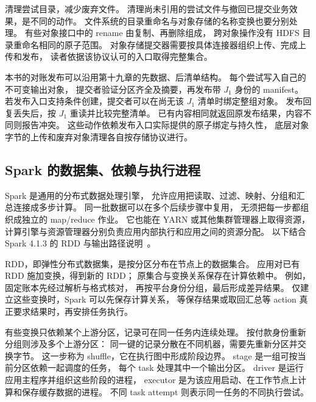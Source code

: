  清理尝试目录，减少废弃文件。
清理尚未引用的尝试文件与撤回已提交业务效果，是不同的动作。
文件系统的目录重命名与对象存储的名称变换也要分别处理。
有些对象接口中的 rename 由复制、再删除组成，
跨对象操作没有 HDFS 目录重命名相同的原子范围。
对象存储提交器需要按具体连接器组织上传、完成上传和发布，
读者依据该协议认可的入口取得完整集合。

本书的对账发布可以沿用第十九章的先数据、后清单结构。
每个尝试写入自己的不可变输出对象，
提交者验证分区齐全及摘要，再发布带 $J_1$ 身份的 manifest。
若发布入口支持条件创建，提交者可以在尚无该 $J_1$ 清单时绑定整组对象。
发布回复丢失后，按 $J_1$ 重读并比较完整清单。
已有内容相同就返回原发布结果，内容不同则报告冲突。
这些动作依赖发布入口实际提供的原子绑定与持久性，
底层对象字节的上传和废弃对象清理各自按存储协议进行。


\subsection{Spark 的数据集、依赖与执行进程}

Spark 是通用的分布式数据处理引擎，
允许应用把读取、过滤、映射、分组和汇总连接成多步计算。
同一批数据可以在多个后续步骤中复用，
无须把每一步都组织成独立的 map/reduce 作业。
它也能在 YARN 或其他集群管理器上取得资源，
计算引擎与资源管理器分别负责应用内部执行和应用之间的资源分配。
以下结合 Spark 4.1.3 的 RDD 与输出路径说明~\cite{spark413-rdd,spark413-cluster}。

RDD，即弹性分布式数据集，是按分区分布在节点上的数据集合。
应用对已有 RDD 施加变换，得到新的 RDD；
原集合与变换关系保存在计算依赖中。
例如，固定账本先经过解析与格式核对，
再按平台身份分组，最后形成差异结果。
仅建立这些变换时，Spark 可以先保存计算关系，
等保存结果或取回汇总等 action 真正要求结果时，再安排任务执行。

有些变换只依赖某个上游分区，记录可在同一任务内连续处理。
按付款身份重新分组则涉及多个上游分区：
同一键的记录分散在不同机器，需要先重新分区并交换字节。
这一步称为 shuffle，它在执行图中形成阶段边界。
stage 是一组可按当前分区依赖一起调度的任务，
每个 task 处理其中一个输出分区。
driver 是运行应用主程序并组织这些阶段的进程，
executor 是为该应用启动、在工作节点上计算和保存缓存数据的进程。
不同 task attempt 则表示同一任务的不同执行尝试。


